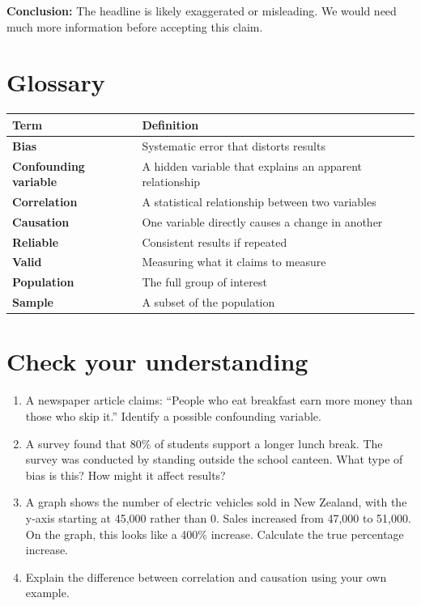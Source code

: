 \documentclass[
  11pt,
  a4paper,
  oneside,
  open=any]{scrbook}
\begin{document}
\textbf{Conclusion:} The headline is likely exaggerated or misleading.
We would need much more information before accepting this claim.

\section{Glossary}\label{glossary-4}

\begin{longtable}[]{@{}
  >{\raggedright\arraybackslash}p{}
  >{\raggedright\arraybackslash}p{}@{}}
\toprule\noalign{}
\begin{minipage}[b]{\linewidth}\raggedright
Term
\end{minipage} & \begin{minipage}[b]{\linewidth}\raggedright
Definition
\end{minipage} \\
\midrule\noalign{}
\endhead
\bottomrule\noalign{}
\endlastfoot
\textbf{Bias} & Systematic error that distorts results \\
\textbf{Confounding variable} & A hidden variable that explains an
apparent relationship \\
\textbf{Correlation} & A statistical relationship between two
variables \\
\textbf{Causation} & One variable directly causes a change in another \\
\textbf{Reliable} & Consistent results if repeated \\
\textbf{Valid} & Measuring what it claims to measure \\
\textbf{Population} & The full group of interest \\
\textbf{Sample} & A subset of the population \\
\end{longtable}

\section{Check your understanding}\label{check-your-understanding-5}

\begin{enumerate}
\def\labelenumi{\arabic{enumi}.}
\item
  A newspaper article claims: ``People who eat breakfast earn more money
  than those who skip it.'' Identify a possible confounding variable.
\item
  A survey found that 80\% of students support a longer lunch break. The
  survey was conducted by standing outside the school canteen. What type
  of bias is this? How might it affect results?
\item
  A graph shows the number of electric vehicles sold in New Zealand,
  with the y-axis starting at 45,000 rather than 0. Sales increased from
  47,000 to 51,000. On the graph, this looks like a 400\% increase.
  Calculate the true percentage increase.
\item
  Explain the difference between correlation and causation using your
  own example.
\end{enumerate}
\end{document}
